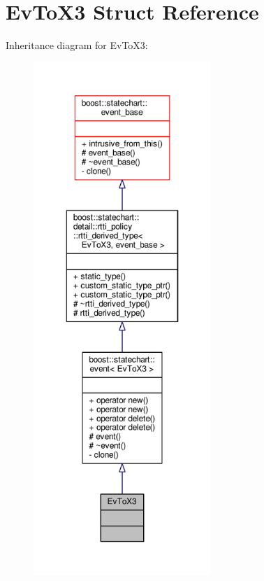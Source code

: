 \hypertarget{struct_ev_to_x3}{}\section{Ev\+To\+X3 Struct Reference}
\label{struct_ev_to_x3}


Inheritance diagram for Ev\+To\+X3\+:
\nopagebreak
\begin{figure}[H]
\begin{center}
\leavevmode
\includegraphics[height=550pt]{struct_ev_to_x3__inherit__graph}
\end{center}
\end{figure}


